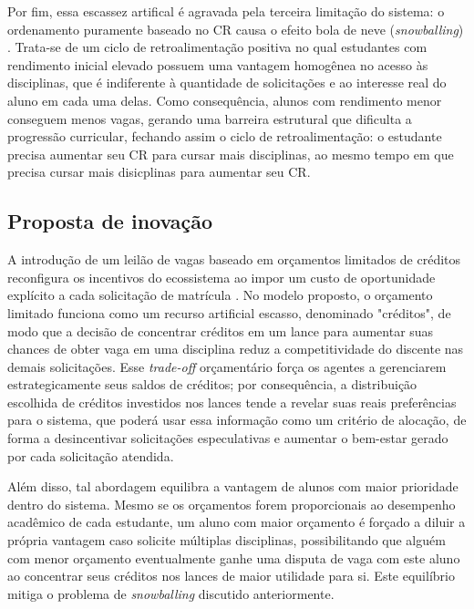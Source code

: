 \documentclass[
    12pt,
    openany,
    oneside,
    a4paper,
    english,
    brazil
]{abntex2}
\begin{document}
Por fim, essa escassez artifical é agravada pela terceira limitação do sistema: o ordenamento puramente baseado no CR causa o efeito bola de neve (\textit{snowballing}) \cite{sonmez2011}. Trata-se de um ciclo de retroalimentação positiva no qual estudantes com rendimento inicial elevado possuem uma vantagem homogênea no acesso às disciplinas, que é indiferente à quantidade de solicitações e ao interesse real do aluno em cada uma delas. Como consequência, alunos com rendimento menor conseguem menos vagas, gerando uma barreira estrutural que dificulta a progressão curricular, fechando assim o ciclo de retroalimentação: o estudante precisa aumentar seu CR para cursar mais disciplinas, ao mesmo tempo em que precisa cursar mais disicplinas para aumentar seu CR.

\subsection{Proposta de inovação}

A introdução de um leilão de vagas baseado em orçamentos limitados de créditos reconfigura os incentivos do ecossistema ao impor um custo de oportunidade explícito a cada solicitação de matrícula \cite{cramton2006}. No modelo proposto, o orçamento limitado funciona como um recurso artificial escasso, denominado "créditos", de modo que a decisão de concentrar créditos em um lance para aumentar suas chances de obter vaga em uma disciplina reduz a competitividade do discente nas demais solicitações. Esse \textit{trade-off} orçamentário força os agentes a gerenciarem estrategicamente seus saldos de créditos; por consequência, a distribuição escolhida de créditos investidos nos lances tende a revelar suas reais preferências para o sistema, que poderá usar essa informação como um critério de alocação, de forma a desincentivar solicitações especulativas e aumentar o bem-estar gerado por cada solicitação atendida.

Além disso, tal abordagem equilibra a vantagem de alunos com maior prioridade dentro do sistema. Mesmo se os orçamentos forem proporcionais ao desempenho acadêmico de cada estudante, um aluno com maior orçamento é forçado a diluir a própria vantagem caso solicite múltiplas disciplinas, possibilitando que alguém com menor orçamento eventualmente ganhe uma disputa de vaga com este aluno ao concentrar seus créditos nos lances de maior utilidade para si. Este equilíbrio mitiga o problema de \textit{snowballing} discutido anteriormente.
\end{document}
